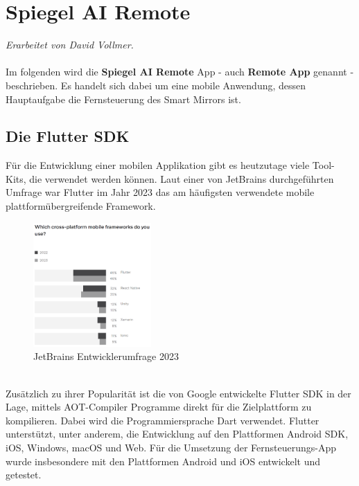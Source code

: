 \chapter{Spiegel AI Remote}
\textit{Erarbeitet von David Vollmer.} \\ \\
Im folgenden wird die \textbf{Spiegel AI Remote} App - auch \textbf{Remote App} genannt - beschrieben. Es handelt sich dabei um eine mobile Anwendung, dessen Hauptaufgabe die Fernsteuerung des Smart Mirrors ist.

\section{Die Flutter\texttrademark{} SDK}
Für die Entwicklung einer mobilen Applikation gibt es heutzutage viele Tool-Kits, die verwendet werden können. Laut einer von JetBrains durchgeführten Umfrage war Flutter im Jahr 2023 das am häufigsten verwendete mobile plattformübergreifende Framework.
\begin{figure}[h]
    \centering
    \includegraphics[width=0.4\textwidth]{pictures/frameworks_stats.png}
    \captionsetup{justification=centering, labelformat=simple, singlelinecheck=false}
    \caption{JetBrains Entwicklerumfrage 2023 \cite{jetbrains_survey}}
    \label{fig:jetbrains_survey}
\end{figure} \\
Zusätzlich zu ihrer Popularität ist die von Google entwickelte Flutter SDK in der Lage, mittels AOT-Compiler Programme direkt für die Zielplattform zu kompilieren. Dabei wird die Programmiersprache Dart verwendet.\cite{dart_platform} Flutter unterstützt, unter anderem, die Entwicklung auf den Plattformen Android SDK, iOS, Windows, macOS und Web.\cite{flutter_supported_platforms} Für die Umsetzung der Fernsteuerungs-App wurde insbesondere mit den Plattformen Android und iOS entwickelt und getestet.

